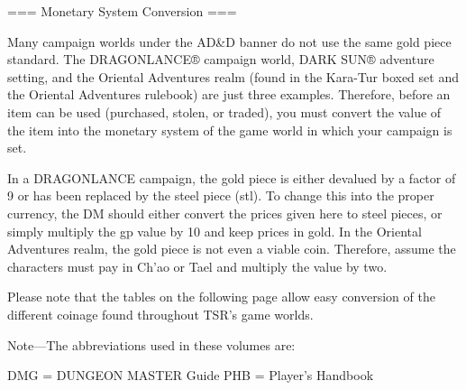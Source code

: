 === Monetary System Conversion ===

Many campaign worlds under the AD&D banner do not use the same gold piece standard. The DRAGONLANCE® campaign world, DARK SUN® adventure setting, and the Oriental Adventures realm (found in the Kara-Tur boxed set and the Oriental Adventures rulebook) are just three examples. Therefore, before an item can be used (purchased, stolen, or traded), you must convert the value of the item into the monetary system of the game world in which your campaign is set.

In a DRAGONLANCE campaign, the gold piece is either devalued by a factor of 9 or has been replaced by the steel piece (stl). To change this into the proper currency, the DM should either convert the prices given here to steel pieces, or simply multiply the gp value by 10 and keep prices in gold. In the Oriental Adventures realm, the gold piece is not even a viable coin. Therefore, assume the characters must pay in Ch’ao or Tael and multiply the value by two.

Please note that the tables on the following page allow easy conversion of the different coinage found throughout TSR’s game worlds.

Note—The abbreviations used in these volumes are:

DMG = DUNGEON MASTER Guide
PHB = Player’s Handbook

